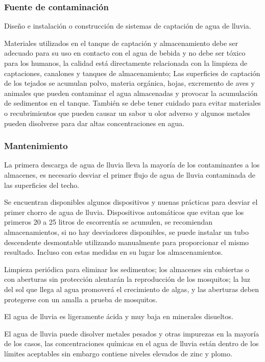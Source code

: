 \subsubsection{Fuente de contaminación}
Diseño e instalación o construcción de sistemas de captación de agua de lluvia.

Materiales utilizados en el tanque de captación y almacenamiento debe ser adecuado para su uso en contacto con el agua de bebida y no debe ser tóxico para los humanos, la calidad está directamente relacionada con la limpieza de captaciones, canalones y tanques de almacenamiento; Las superficies de captación de los tejados se acumulan polvo, materia orgánica, hojas, excremento de aves y animales que pueden contaminar el agua almacenadas y provocar la acumulación de sedimentos en el tanque. También se debe tener cuidado para evitar materiales o recubrimientos que pueden causar un sabor u olor adverso y algunos metales pueden disolverse para dar altas concentraciones en agua.
\subsubsection{Mantenimiento}
La primera descarga de agua de lluvia lleva la mayoría de los contaminantes a los almacenes, es necesario desviar el primer flujo de agua de lluvia contaminada de las superficies del techo.

Se encuentran disponibles algunos dispositivos y nuenas prácticas para desviar el primer chorro de agua de lluvia. Dispositivos automáticos que evitan que los primeros 20 a 25 litros de escorrentía se acumulen, se recomiendan almacenamientos, si no hay desviadores disponibles, se puede instalar un tubo descendente desmontable utilizando manualmente para proporcionar el mismo resultado. Incluso con estas medidas en su lugar los almacenamientos.

Limpieza periódica para eliminar los sedimentos; los almacenes sin cubiertas o con aberturas sin protección alentarán la reproducción de los mosquitos; la luz del sol que llega al agua promoverá el crecimiento de algas, y las aberturas deben protegerse con un amalla a prueba de mosquitos.

El agua de lluvia es ligeramente ácida y muy baja en minerales disueltos.

El agua de lluvia puede disolver metales pesados y otras impurezas en la mayoría de los casos, las concentraciones químicas en el agua de lluvia están dentro de los límites aceptables sin embargo contiene niveles elevados de zinc y plomo.

